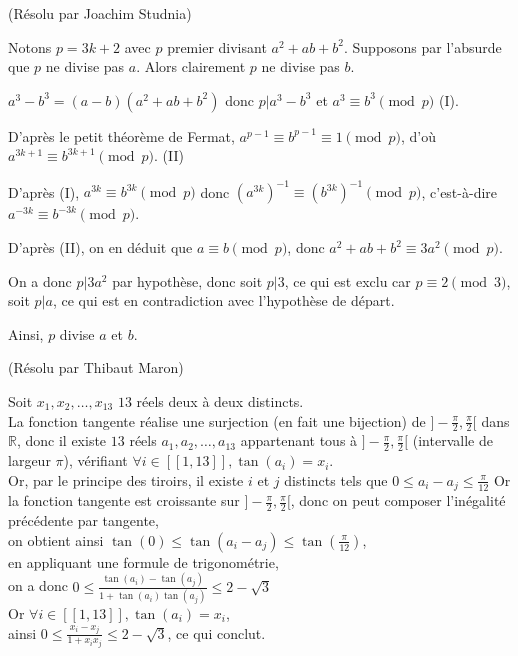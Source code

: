 \begin{sol}[126](Résolu par Joachim Studnia)

Notons $p=3k+2$ avec $p$ premier divisant $a^2+ab+b^2$. Supposons par l'absurde que $p$ ne divise pas $a$. Alors clairement $p$ ne divise pas $b$.

$a^3-b^3 = (a-b)(a^2+ab+b^2)$ donc $p | a^3-b^3$ et $a^3 \equiv b^3 \pmod p$ (I).

D'après le petit théorème de Fermat, \mbox{$a^{p-1} \equiv b^{p-1} \equiv 1 \pmod p$}, d'où \mbox{$a^{3k+1} \equiv b^{3k+1} \pmod p$}. (II)

D'après (I), $a^{3k} \equiv b^{3k} \pmod p$ donc $(a^{3k})^{-1} \equiv (b^{3k})^{-1} \pmod p$, c'est-à-dire $a^{-3k} \equiv b^{-3k} \pmod p$.

D'après (II), on en déduit que $a \equiv b \pmod p$, donc \mbox{$a^2+ab+b^2 \equiv 3a^2 \pmod p$}.

On a donc $p | 3a^2$ par hypothèse, donc soit $p | 3$, ce qui est exclu car \mbox{$p \equiv 2 \pmod 3$}, soit $p |a$, ce qui est en contradiction avec l'hypothèse de départ.

Ainsi, $p$ divise $a$ et $b$.

\end{sol}

\begin{sol}[130](Résolu par Thibaut Maron)

Soit $x_1,x_2,\dots,x_{13}$ $13$ r\'eels deux \`a deux distincts.\\
La fonction tangente réalise une surjection (en fait une bijection) de $]-\frac{\pi}{2},\frac{\pi}{2}[$ dans $\mathbb{R}$, donc il existe $13$ réels $a_1,a_2,\dots,a_{13}$ appartenant tous \`a $]-\frac{\pi}{2},\frac{\pi}{2}[$ (intervalle de largeur $\pi$),
vérifiant $\forall i \in [[1,13]], \tan(a_i)=x_i$. \\
Or, par le principe des tiroirs, il existe $i$ et $j$ distincts tels que $ 0 \leq a_i-a_j \leq \frac{\pi}{12}$
Or la fonction tangente est croissante sur $]-\frac{\pi}{2},\frac{\pi}{2}[$, donc on peut composer l'in\'egalit\'e pr\'ec\'edente par tangente, \\
on obtient ainsi $\tan(0) \leq \tan(a_i-a_j) \leq \tan(\frac{\pi}{12})$, \\
en appliquant une formule de trigonométrie, \\
on a donc $0 \leq \frac{\tan(a_i)-\tan(a_j)}{1+\tan(a_i)\tan(a_j)} \leq 2-\sqrt{3} $ \\
Or $\forall i \in [[1,13]], \tan(a_i)=x_i$, \\
ainsi $0 \leq \frac{x_i-x_j}{1+x_i x_j} \leq 2-\sqrt{3}$,
ce qui conclut.
\end{sol}

